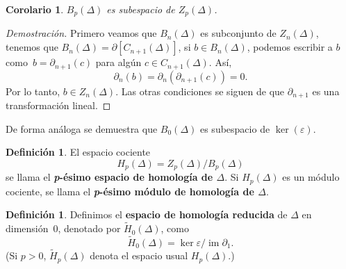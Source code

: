 \documentclass[12pt]{book}
\newtheorem{corollary}[theorem]{Corolario}
\theoremstyle{definition}
\newtheorem{definition}[theorem]{Definición}
\DeclareMathOperator{\im}{im}
\newcounter{in}
\newcounter{ini}
\begin{document}
\begin{corollary}
  $B_{p}(\Delta)$ es subespacio de $Z_{p}(\Delta)$.
\end{corollary}
\begin{proof}[Demostración]
  Primero veamos que $B_{n}(\Delta)$ es subconjunto de
  $Z_{n}(\Delta)$, tenemos que
  $B_{n}(\Delta)=\partial[C_{n+1}(\Delta)]$, si $b\in B_{n}(\Delta)$,
  podemos escribir a $b$ como~$b=\partial_{n+1}(c)$ para algún $c\in
  C_{n+1}(\Delta)$. Así,
$$\partial_{n}(b)=\partial_{n}(\partial_{n+1}(c))=0.$$
Por lo tanto, $b\in Z_{n}(\Delta)$.  Las otras condiciones se siguen
de que $\partial_{n+1}$ es una transformación lineal.
\end{proof}
De forma análoga se demuestra que $B_{0}(\Delta)$ es subespacio de $\ker(\varepsilon)$.
\begin{definition}
   El espacio cociente
   $$H_{p}(\Delta)=Z_{p}(\Delta)/B_{p}(\Delta)$$
   se llama el \textbf{\emph{p}-ésimo espacio de homología de
     $\Delta$}. Si $H_{p}(\Delta)$ es un módulo cociente, se llama el
   \textbf{\emph{p}-ésimo módulo de homología de
     $\Delta$}.
\end{definition}

\begin{definition}
  Definimos el \textbf{espacio de homología reducida} de $\Delta$ en
  dimensión~$0$, denotado por $\widetilde H_{0}(\Delta)$, como
  \begin{equation*}
    \widetilde H_{0}(\Delta)=\ker\varepsilon/\im \partial_{1}.
  \end{equation*}
  (Si $p>0$, $\widetilde H_{p}(\Delta)$ denota el espacio usual
  $H_{p}(\Delta)$.)
\end{definition}
\end{document}
